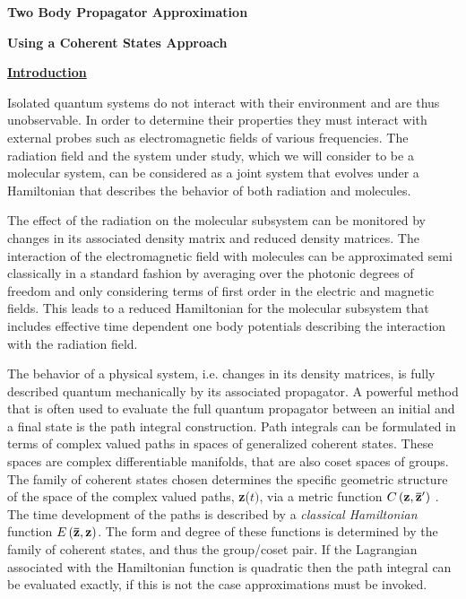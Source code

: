 \documentclass{amsart}
\begin{document}
\begin{center}
\textbf{Two Body Propagator Approximation}
\end{center}

\begin{center}
\textbf{Using a Coherent States Approach}
\end{center}

\underline {\textbf{Introduction}}

Isolated quantum systems do not interact with their environment and are thus
unobservable. In order to determine their properties they must interact with
external probes such as electromagnetic fields of various frequencies. The
radiation field and the system under study, which we will consider to be a
molecular system, can be considered as a joint system that evolves under a
Hamiltonian that describes the behavior of both radiation and molecules.

The effect of the radiation on the molecular subsystem can be monitored by
changes in its associated density matrix and reduced density matrices. The
interaction of the electromagnetic field with molecules can be approximated
semi classically in a standard fashion by averaging over the photonic
degrees of freedom and only considering terms of first order in the electric
and magnetic fields. This leads to a reduced Hamiltonian for the molecular
subsystem that includes effective time dependent one body potentials
describing the interaction with the radiation field.

The behavior of a physical system, i.e. changes in its density matrices, is
fully described quantum mechanically by its associated propagator. A
powerful method that is often used to evaluate the full quantum propagator
between an initial and a final state is the path integral construction. Path
integrals can be formulated in terms of complex valued paths in spaces of
generalized coherent states. These spaces are complex differentiable
manifolds, that are also coset spaces of groups. The family of coherent
states chosen determines the specific geometric structure of the space of
the complex valued paths, \textbf{z}($t)$, via a metric function $C\left( {{\rm
{\bf z}},{\rm {\bf {\bar {z}}'}}} \right)$ . The time development of the
paths is described by a \textit{classical Hamiltonian }function $E\left( {{\rm {\bf \bar {z}}},{\rm {\bf
z}}} \right)$. The form and degree of these functions is determined by the
family of coherent states, and thus the group/coset pair. If the Lagrangian
associated with the Hamiltonian function is quadratic then the path integral
can be evaluated exactly, if this is not the case approximations must be
invoked.
\end{document}
